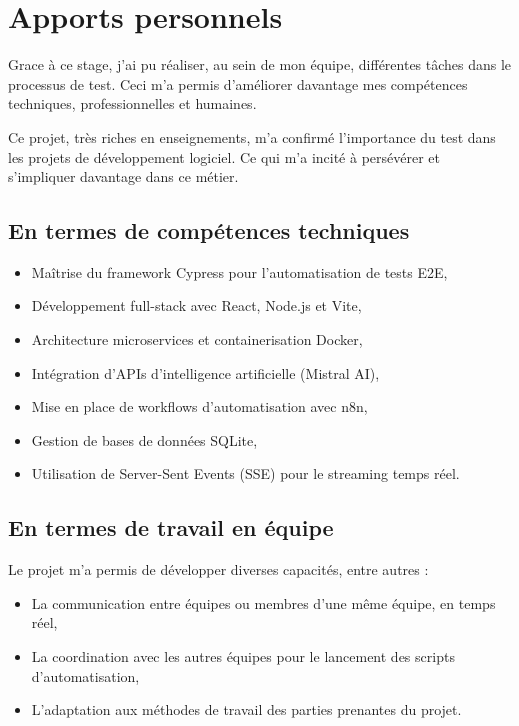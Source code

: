 \section{Apports personnels}

Grace à ce stage, j'ai pu réaliser, au sein de mon équipe, différentes tâches dans le processus de test. Ceci m'a permis d'améliorer davantage mes compétences techniques, professionnelles et humaines.

Ce projet, très riches en enseignements, m'a confirmé l'importance du test dans les projets de développement logiciel. Ce qui m'a incité à persévérer et s'impliquer davantage dans ce métier.

\subsection{En termes de compétences techniques}

\begin{itemize}[leftmargin=*]
\item Maîtrise du framework Cypress pour l'automatisation de tests E2E,
\item Développement full-stack avec React, Node.js et Vite,
\item Architecture microservices et containerisation Docker,
\item Intégration d'APIs d'intelligence artificielle (Mistral AI),
\item Mise en place de workflows d'automatisation avec n8n,
\item Gestion de bases de données SQLite,
\item Utilisation de Server-Sent Events (SSE) pour le streaming temps réel.
\end{itemize}

\subsection{En termes de travail en équipe}

Le projet m'a permis de développer diverses capacités, entre autres :
\begin{itemize}[leftmargin=*]
\item La communication entre équipes ou membres d'une même équipe, en temps réel,
\item La coordination avec les autres équipes pour le lancement des scripts d'automatisation,
\item L'adaptation aux méthodes de travail des parties prenantes du projet.
\end{itemize}

